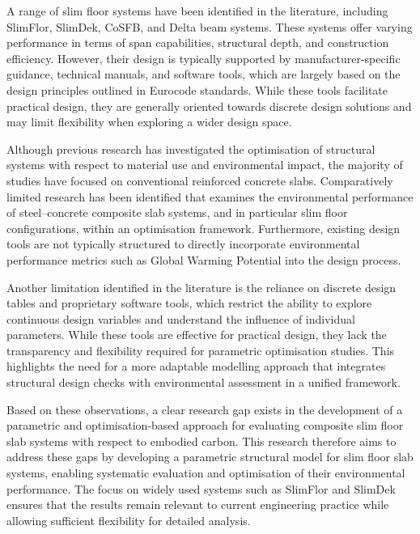 A range of slim floor systems have been identified in the literature, including SlimFlor, SlimDek, CoSFB, and Delta beam systems. These systems offer varying performance in terms of span capabilities, structural depth, and construction efficiency. However, their design is typically supported by manufacturer-specific guidance, technical manuals, and software tools, which are largely based on the design principles outlined in Eurocode standards. While these tools facilitate practical design, they are generally oriented towards discrete design solutions and may limit flexibility when exploring a wider design space.

Although previous research has investigated the optimisation of structural systems with respect to material use and environmental impact, the majority of studies have focused on conventional reinforced concrete slabs. Comparatively limited research has been identified that examines the environmental performance of steel–concrete composite slab systems, and in particular slim floor configurations, within an optimisation framework. Furthermore, existing design tools are not typically structured to directly incorporate environmental performance metrics such as Global Warming Potential into the design process.

Another limitation identified in the literature is the reliance on discrete design tables and proprietary software tools, which restrict the ability to explore continuous design variables and understand the influence of individual parameters. While these tools are effective for practical design, they lack the transparency and flexibility required for parametric optimisation studies. This highlights the need for a more adaptable modelling approach that integrates structural design checks with environmental assessment in a unified framework.

Based on these observations, a clear research gap exists in the development of a parametric and optimisation-based approach for evaluating composite slim floor slab systems with respect to embodied carbon. This research therefore aims to address these gaps by developing a parametric structural model for slim floor slab systems, enabling systematic evaluation and optimisation of their environmental performance. The focus on widely used systems such as SlimFlor and SlimDek ensures that the results remain relevant to current engineering practice while allowing sufficient flexibility for detailed analysis.